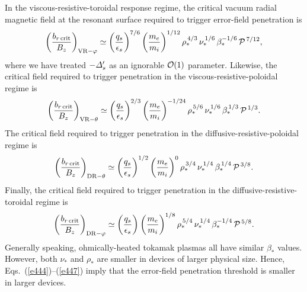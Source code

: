 \documentclass[12pt,prb,aps]{revtex4-1}
\begin{document}
In the viscous-resistive-toroidal response regime, the critical vacuum radial magnetic
field at the resonant surface required to
trigger error-field penetration is\,\cite{cole}
\begin{equation}\label{e444}
\left(\frac{b_{r\,{\rm crit}}}{B_z}\right)_{{\rm VR}-\varphi} \simeq \left(\frac{q_s}{\epsilon_s}\right)^{7/6}\left(\frac{m_e}{m_i}\right)^{1/12}
\rho_\ast^{\,4/3}\,\nu_\ast^{\,1/6}\,\beta_\ast^{-1/6}\,{\cal P}^{\,7/12},
\end{equation}
where we have treated $-{\mit\Delta}_s'$ as an ignorable ${\cal O}(1)$ parameter. Likewise,  the critical
field required to trigger penetration in the viscous-resistive-poloidal regime is
\begin{equation}
\left(\frac{b_{r\,{\rm crit}}}{B_z}\right)_{{\rm VR}-\theta} \simeq  \left(\frac{q_s}{\epsilon_s}\right)^{2/3}\left(\frac{m_e}{m_i}\right)^{-1/24}
\rho_\ast^{\,5/6}\,\nu_\ast^{\,1/6}\,\beta_\ast^{\,1/3}\,{\cal P}^{\,1/3}.
\end{equation}
The critical field required to trigger penetration in the diffusive-resistive-poloidal regime is
\begin{equation}
\left(\frac{b_{r\,{\rm crit}}}{B_z}\right)_{{\rm DR}-\theta} \simeq  \left(\frac{q_s}{\epsilon_s}\right)^{1/2}\left(\frac{m_e}{m_i}\right)^{0}
\rho_\ast^{\,3/4}\,\nu_\ast^{\,1/4}\,\beta_\ast^{\,1/4}\,{\cal P}^{\,3/8}.
\end{equation}
Finally, the critical field 
required to  trigger penetration in the diffusive-resistive-toroidal regime is
\begin{equation}
\left(\frac{b_{r\,{\rm crit}}}{B_z}\right)_{{\rm DR}-\varphi} \simeq  \left(\frac{q_s}{\epsilon_s}\right)^{}\left(\frac{m_e}{m_i}\right)^{1/8}
\rho_\ast^{\,5/4}\,\nu_\ast^{\,1/4}\,\beta_\ast^{-1/4}\,{\cal P}^{\,5/8}.\label{e447}
\end{equation}
Generally speaking, ohmically-heated tokamak plasmas all  have similar $\beta_\ast$ values. However,
both $\nu_\ast$ and $\rho_\ast$ are smaller in devices of larger physical size. Hence, Eqs.~(\ref{e444})--(\ref{e447})
imply that the error-field penetration threshold is smaller in larger devices. 
\end{document}
